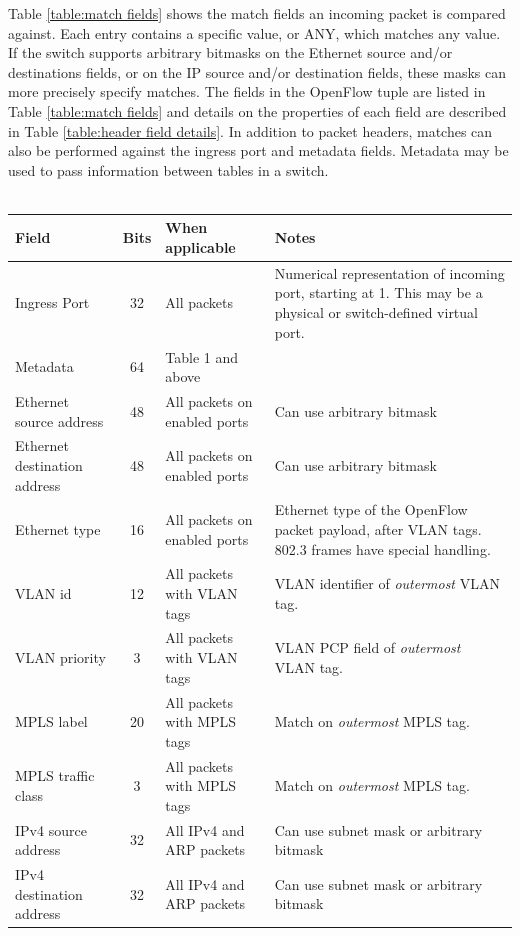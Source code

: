 \documentclass[10pt]{article}
\begin{document}
Table \ref{table:match fields} shows the match fields an incoming packet is compared against. Each entry contains a specific value, or ANY, which matches any value. If the switch supports arbitrary bitmasks on the Ethernet source and/or destinations fields, or on the IP source and/or destination fields, these masks can more precisely specify matches.  The fields in the OpenFlow tuple are listed in Table \ref{table:match fields} and details on the properties of each field are described in Table \ref{table:header field details}. In addition to packet headers, matches can also be performed against the ingress port and metadata fields. Metadata may be used to pass information between tables in a switch.
\\\\
\begin{table}[hbp]
\centering
\footnotesize
\begin{tabularx}{\textwidth}{ |X|c|X|X| }
\hline Field & Bits & When applicable & Notes \\
\hline Ingress Port & 32 & All packets & Numerical representation of incoming port, starting at 1. This may be a physical or switch-defined virtual port. \\
\hline Metadata & 64 & Table 1 and above & \\
\hline Ethernet source address & 48 & All packets on enabled ports & Can use arbitrary bitmask \\
\hline Ethernet destination address & 48 & All packets on enabled ports & Can use arbitrary bitmask \\
\hline Ethernet type & 16 & All packets on enabled ports & Ethernet type of the OpenFlow packet payload, after VLAN tags. 802.3 frames have special handling. \\
\hline VLAN id & 12 & All packets with VLAN tags & VLAN identifier of \emph{outermost} VLAN tag. \\
\hline VLAN priority & 3 & All packets with VLAN tags & VLAN PCP field of \emph{outermost} VLAN tag. \\
\hline MPLS label & 20 & All packets with MPLS tags & Match on \emph{outermost} MPLS tag. \\
\hline MPLS traffic class & 3 & All packets with MPLS tags & Match on \emph{outermost} MPLS tag. \\
\hline IPv4 source address & 32 & All IPv4 and ARP packets & Can use subnet mask or arbitrary bitmask \\
\hline IPv4 destination address & 32 & All IPv4 and ARP packets & Can use subnet mask or arbitrary bitmask \\

\end{tabularx}
\end{table}
\end{document}
